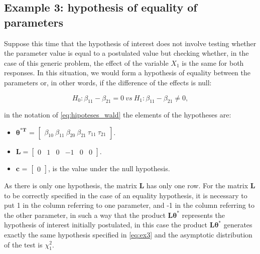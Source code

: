 \documentclass[AMA,STIX1COL]{WileyNJD-v2}
\begin{document}
\subsection{Example 3: hypothesis of equality of parameters}

Suppose this time that the hypothesis of interest does not involve testing whether the parameter value is equal to a postulated value but checking whether, in the case of this generic problem, the effect of the variable $X_1$ is the same for both responses. In this situation, we would form a hypothesis of equality between the parameters or, in other words, if the difference of the effects is null:

\begin{equation}
\label{eq:ex3}
H_0: \beta_{11} - \beta_{21} = 0 \ vs \ H_1: \beta_{11} - \beta_{21} \neq 0,
\end{equation}

\noindent in the notation of \autoref{eq:hipoteses_wald} the elements of the hypotheses are:

\begin{itemize}
  
  \item $\boldsymbol{\theta^{*T}}$ = $\begin{bmatrix} \beta_{10} \  \beta_{11} \ \beta_{20} \ \beta_{21} \ \tau_{11} \ \tau_{21} \end{bmatrix}$.


\item $\boldsymbol{L} = \begin{bmatrix} 0 & 1 & 0 & -1 & 0 & 0  \end{bmatrix}.$
 
\item $\boldsymbol{c}$ = $\begin{bmatrix} 0 \end{bmatrix}$, is the value under the null hypothesis. 

\end{itemize}

As there is only one hypothesis, the matrix $\boldsymbol{L}$ has only one row. For the matrix $\boldsymbol{L}$ to be correctly specified in the case of an equality hypothesis, it is necessary to put 1 in the column referring to one parameter, and -1 in the column referring to the other parameter, in such a way that the product $\boldsymbol {L}\boldsymbol{\theta^{*}}$ represents the hypothesis of interest initially postulated, in this case the product $\boldsymbol{L}\boldsymbol{\theta^{*}}$ generates exactly the same hypothesis specified in \autoref{eq:ex3} and the asymptotic distribution of the test is $\chi^2_1$.
\end{document}
